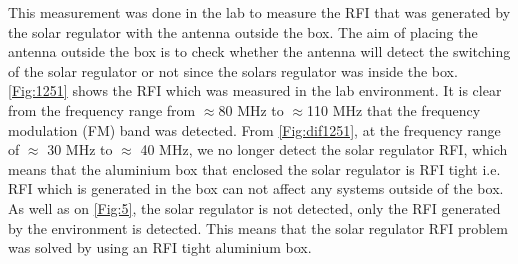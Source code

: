 \documentclass[12pt,a4paper]{report}
\begin{document}
This measurement was done in the lab to measure the RFI that was generated by the solar regulator with the antenna outside the box. The aim of placing the antenna outside the box is to check whether the antenna will detect the switching of the solar regulator or not since the solars regulator was inside the box. \\

\autoref{Fig:1251} shows the RFI which was measured in the lab environment. It is clear from the frequency range from $\approx$80 MHz to $\approx$110 MHz that the frequency modulation (FM) band was detected. From \autoref{Fig:dif1251}, at the frequency range of $\approx$ 30 MHz to $\approx$ 40 MHz, we no longer detect the solar regulator RFI, which means that the aluminium box that enclosed the solar regulator is RFI tight i.e. RFI which is generated in the box can not affect any systems outside of the box. As well as on \autoref{Fig:5}, the solar regulator is not detected, only the RFI generated by the environment is detected. This means that the solar regulator RFI problem was solved by using an RFI tight aluminium box.
\end{document}

